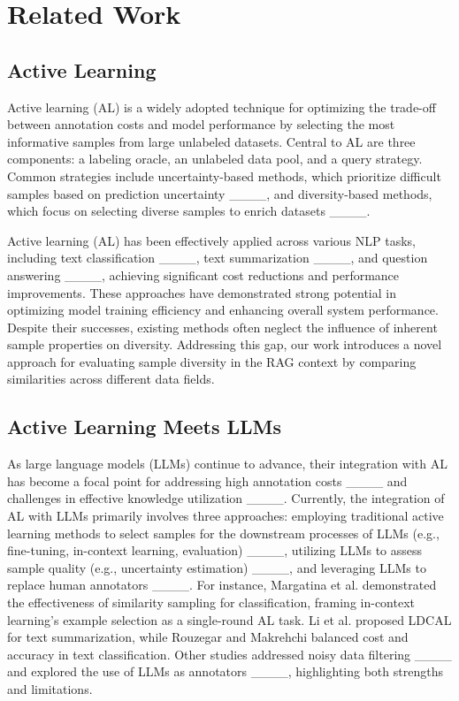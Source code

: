 \section{Related Work}
\subsection{Active Learning}

Active learning (AL) is a widely adopted technique for optimizing the trade-off between annotation costs and model performance by selecting the most informative samples from large unlabeled datasets. Central to AL are three components: a labeling oracle, an unlabeled data pool, and a query strategy. Common strategies include uncertainty-based methods, which prioritize difficult samples based on prediction uncertainty ____, and diversity-based methods, which focus on selecting diverse samples to enrich datasets ____. 

Active learning (AL) has been effectively applied across various NLP tasks, including text classification ____, text summarization ____, and question answering ____, achieving significant cost reductions and performance improvements. These approaches have demonstrated strong potential in optimizing model training efficiency and enhancing overall system performance. Despite their successes, existing methods often neglect the influence of inherent sample properties on diversity. Addressing this gap, our work introduces a novel approach for evaluating sample diversity in the RAG context by comparing similarities across different data fields.

\subsection{Active Learning Meets LLMs}

As large language models (LLMs) continue to advance, their integration with AL has become a focal point for addressing high annotation costs ____ and challenges in effective knowledge utilization ____. Currently, the integration of AL with LLMs primarily involves three approaches: employing traditional active learning methods to select samples for the downstream processes of LLMs (e.g., fine-tuning, in-context learning, evaluation) ____, utilizing LLMs to assess sample quality (e.g., uncertainty estimation) ____, and leveraging LLMs to replace human annotators ____. For instance, Margatina et al.  demonstrated the effectiveness of similarity sampling for classification, framing in-context learning’s example selection as a single-round AL task. Li et al.  proposed LDCAL for text summarization, while Rouzegar and Makrehchi  balanced cost and accuracy in text classification. Other studies addressed noisy data filtering ____ and explored the use of LLMs as annotators ____, highlighting both strengths and limitations.

